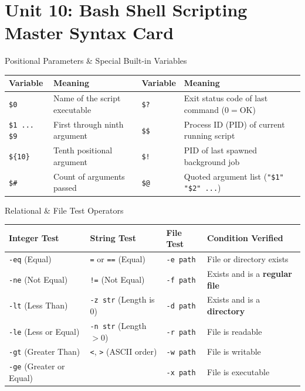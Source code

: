 \chapter{Unit 10: Bash Shell Scripting Master Syntax Card}

\begin{cheatbox}{Positional Parameters \& Special Built-in Variables}
\begin{tabularx}{\linewidth}{l X l X}
\toprule
\textbf{Variable} & \textbf{Meaning} & \textbf{Variable} & \textbf{Meaning} \\
\midrule
\texttt{\$0} & Name of the script executable & \texttt{\$?} & Exit status code of last command ($0 = \text{OK}$) \\
\texttt{\$1 ... \$9} & First through ninth argument & \texttt{\$\$} & Process ID (PID) of current running script \\
\texttt{\$\{10\}} & Tenth positional argument & \texttt{\$!} & PID of last spawned background job \\
\texttt{\$\#} & Count of arguments passed & \texttt{\$@} & Quoted argument list (\texttt{"\$1" "\$2" ...}) \\
\bottomrule
\end{tabularx}
\end{cheatbox}

\begin{syntaxbox}{Relational \& File Test Operators}
\begin{tabularx}{\linewidth}{l l l l}
\toprule
\textbf{Integer Test} & \textbf{String Test} & \textbf{File Test} & \textbf{Condition Verified} \\
\midrule
\texttt{-eq} (Equal) & \texttt{=} or \texttt{==} (Equal) & \texttt{-e path} & File or directory exists \\
\texttt{-ne} (Not Equal) & \texttt{!=} (Not Equal) & \texttt{-f path} & Exists and is a \textbf{regular file} \\
\texttt{-lt} (Less Than) & \texttt{-z str} (Length is 0) & \texttt{-d path} & Exists and is a \textbf{directory} \\
\texttt{-le} (Less or Equal) & \texttt{-n str} (Length $>0$) & \texttt{-r path} & File is readable \\
\texttt{-gt} (Greater Than) & \texttt{<}, \texttt{>} (ASCII order) & \texttt{-w path} & File is writable \\
\texttt{-ge} (Greater or Equal) & & \texttt{-x path} & File is executable \\
\bottomrule
\end{tabularx}
\end{syntaxbox}

